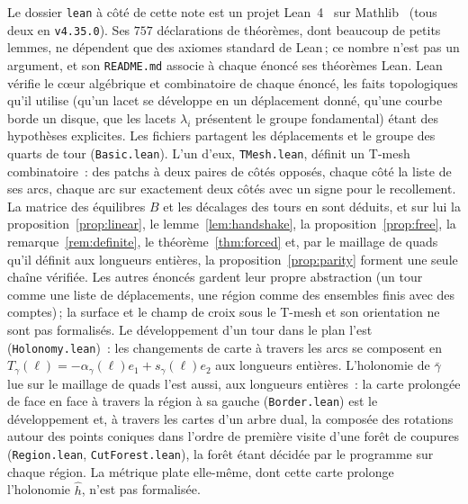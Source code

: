 \documentclass[11pt,a4paper]{article}
\newcommand{\shift}{s}
\begin{document}
Le dossier \texttt{lean} à côté de cette note est un projet
Lean~4~\cite{demoura2021lean4} sur Mathlib~\cite{mathlib2020} (tous deux en
\texttt{v4.35.0}). Ses $757$ déclarations de théorèmes, dont beaucoup de
petits lemmes, ne dépendent que des axiomes standard de Lean\,; ce nombre
n'est pas un argument, et son \texttt{README.md} associe à chaque énoncé ses
théorèmes Lean. Lean vérifie le cœur algébrique et combinatoire de chaque
énoncé, les faits topologiques qu'il utilise (qu'un lacet se développe en un
déplacement donné, qu'une courbe borde un disque, que les lacets $\lambda_i$
présentent le groupe fondamental) étant des hypothèses explicites. Les fichiers partagent les
déplacements et le groupe des quarts de tour (\texttt{Basic.lean}). L'un
d'eux, \texttt{TMesh.lean}, définit un T-mesh combinatoire~: des patchs à
deux paires de côtés opposés, chaque côté la liste de ses arcs, chaque arc sur
exactement deux côtés avec un signe pour le recollement. La matrice des
équilibres $B$ et les décalages des tours en sont déduits, et sur lui la
proposition~\ref{prop:linear}, le lemme~\ref{lem:handshake}, la
proposition~\ref{prop:free}, la remarque~\ref{rem:definite}, le
théorème~\ref{thm:forced} et, par le maillage de quads qu'il définit aux
longueurs entières, la proposition~\ref{prop:parity} forment une seule
chaîne vérifiée. Les autres
énoncés gardent leur propre abstraction (un tour comme une liste de
déplacements, une région comme des ensembles finis avec des comptes)\,; la
surface et le champ de croix sous le T-mesh et son orientation ne sont pas
formalisés. Le développement d'un tour dans le plan l'est
(\texttt{Holonomy.lean})~: les changements de carte à travers les arcs se
composent en $T_\gamma(\ell) = -\alpha_\gamma(\ell) e_1 + \shift_\gamma(\ell)
e_2$ aux longueurs entières. L'holonomie de $\bar\gamma$ lue sur le maillage
de quads l'est aussi, aux longueurs entières~: la carte prolongée de face en
face à travers la région à sa gauche (\texttt{Border.lean}) est le
développement et, à travers les cartes d'un arbre dual, la composée des
rotations autour des points coniques dans l'ordre de première visite d'une
forêt de coupures (\texttt{Region.lean}, \texttt{CutForest.lean}), la forêt
étant décidée par le programme sur chaque région. La métrique plate
elle-même, dont cette carte prolonge l'holonomie $\hat h$, n'est pas
formalisée.
\end{document}
